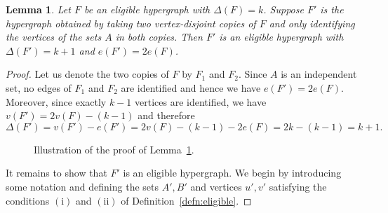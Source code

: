 \documentclass{daj}
\theoremstyle{plain}
\newtheorem{lemma}[theorem]{Lemma}
\theoremstyle{remark}
\begin{document}
\begin{lemma}\label{lemma:maintaining eligibility}
Let $F$ be an eligible hypergraph with $\Delta(F)=k$. Suppose $F'$ is the hypergraph obtained by taking two vertex-disjoint copies of $F$ and only identifying the vertices of the sets $A$ in both copies. Then $F'$ is an eligible hypergraph with $\Delta(F')=k+1$ and $e(F')=2e(F)$.
\end{lemma}
\begin{proof}
Let us denote the two copies of $F$ by $F_1$ and $F_2$. Since $A$ is an independent set, no edges of $F_1$ and $F_2$ are identified and hence we have $e(F')=2e(F)$. Moreover, since exactly $k-1$ vertices are identified, we have $v(F')=2v(F)-(k-1)$ and therefore \[\Delta(F')=v(F')-e(F')=2v(F)-(k-1)-2e(F)=2k-(k-1)=k+1.\]

\begin{figure}[h!]
    \centering
    \caption{Illustration of the proof of Lemma~\ref{lemma:maintaining eligibility}.}
\end{figure}

It remains to show that $F'$ is an eligible hypergraph. We begin by introducing some notation and defining the sets $A', B'$ and vertices $u', v'$ satisfying the conditions $\mathrm{(i)}$ and $\mathrm{(ii)}$ of Definition~\ref{defn:eligible}.


\end{proof}
\end{document}
